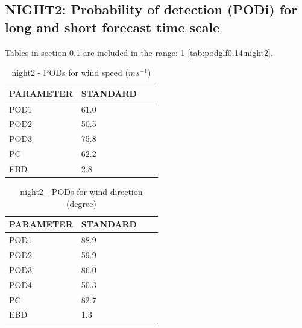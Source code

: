 \subsection{NIGHT2: Probability of detection (PODi) for long and short forecast time scale}\label{subsec:night2:pod}
Tables in section \ref{subsec:night2:pod} are included in the range: \ref{tab:podws:night2}-\ref{tab:podglf0.14:night2}.
\begin{table}[h!]
\begin{center}
\begin{tabular}{|l|l|l|l|}
\hline
\multicolumn{1}{|c|}{\cellcolor[HTML]{C0C0C0}\textbf{PARAMETER}} & \multicolumn{1}{c|}{\cellcolor[HTML]{C0C0C0}\textbf{STANDARD}} \\
\hline
\cellcolor[HTML]{C0C0C0}POD1  & 61.0                                \\
\cellcolor[HTML]{C0C0C0}POD2  & 50.5                                \\
\cellcolor[HTML]{C0C0C0}POD3  & 75.8                                \\
\cellcolor[HTML]{C0C0C0}PC    & 62.2                                  \\
\cellcolor[HTML]{C0C0C0}EBD   & 2.8                                 \\
\hline
\end{tabular}
\caption{night2 - PODs for wind speed ($m s^{-1}$)}
\label{tab:podws:night2}
\end{center}
\end{table}
\begin{table}[p!]
\begin{center}
\begin{tabular}{|l|l|l|l|}
\hline
\multicolumn{1}{|c|}{\cellcolor[HTML]{C0C0C0}\textbf{PARAMETER}} & \multicolumn{1}{c|}{\cellcolor[HTML]{C0C0C0}\textbf{STANDARD}}\\
\hline
\cellcolor[HTML]{C0C0C0}POD1  & 88.9      \\
\cellcolor[HTML]{C0C0C0}POD2  & 59.9      \\
\cellcolor[HTML]{C0C0C0}POD3  & 86.0      \\
\cellcolor[HTML]{C0C0C0}POD4  & 50.3      \\
\cellcolor[HTML]{C0C0C0}PC    & 82.7        \\
\cellcolor[HTML]{C0C0C0}EBD   & 1.3       \\
\hline
\end{tabular}
\caption{night2 - PODs for wind direction (degree)}
\label{tab:podwd:night2}
\end{center}
\end{table}
